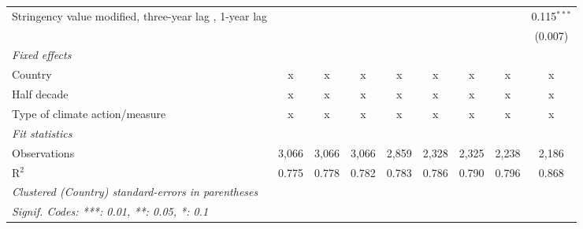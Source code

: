 \begin{table}[htbp]
\begin{tabular}{lcccccccc}
      Stringency value modified, three-year lag , 1-year lag                                       &         &         &              &               &               &               &               & 0.115$^{***}$\\   
                                                                                                   &         &         &              &               &               &               &               & (0.007)\\   
      \emph{Fixed effects}\\
      Country                                                                                      & x       & x       & x            & x             & x             & x             & x             & x\\  
      Half decade                                                                                  & x       & x       & x            & x             & x             & x             & x             & x\\  
      Type of climate action/measure                                                               & x       & x       & x            & x             & x             & x             & x             & x\\  
      \midrule \emph{Fit statistics}\\
      Observations                                                                                 & 3,066   & 3,066   & 3,066        & 2,859         & 2,328         & 2,325         & 2,238         & 2,186\\  
      R$^2$                                                                                        & 0.775   & 0.778   & 0.782        & 0.783         & 0.786         & 0.790         & 0.796         & 0.868\\  
      \midrule
      \multicolumn{9}{l}{\emph{Clustered (Country) standard-errors in parentheses}}\\
      \multicolumn{9}{l}{\emph{Signif. Codes: ***: 0.01, **: 0.05, *: 0.1}}\\
   \end{tabular}
\end{table}


